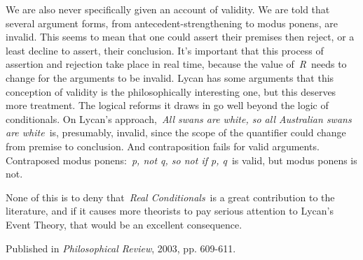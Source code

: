 \documentclass[
  10pt,
  letterpaper,
  DIV=11,
  numbers=noendperiod,
  twoside]{scrartcl}
\begin{document}
We are also never specifically given an account of validity. We are told
that several argument forms, from antecedent-strengthening to modus
ponens, are invalid. This seems to mean that one could assert their
premises then reject, or a least decline to assert, their conclusion.
It's important that this process of assertion and rejection take place
in real time, because the value of~\emph{R}~needs to change for the
arguments to be invalid. Lycan has some arguments that this conception
of validity is the philosophically interesting one, but this deserves
more treatment. The logical reforms it draws in go well beyond the logic
of conditionals. On Lycan's approach,~\emph{All swans are white, so all
Australian swans are white}~is, presumably, invalid, since the scope of
the quantifier could change from premise to conclusion. And
contraposition fails for valid arguments. Contraposed modus
ponens:~\emph{p, not q, so not if p, q}~is valid, but modus ponens is
not.

None of this is to deny that~\emph{Real Conditionals}~is a great
contribution to the literature, and if it causes more theorists to pay
serious attention to Lycan's Event Theory, that would be an excellent
consequence.

\vspace{1cm}



\noindent Published in\emph{
Philosophical Review}, 2003, pp. 609-611.
\end{document}
